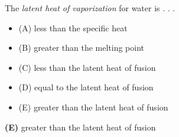 

The {\it latent heat of vaporization} for water is . . .

\begin{itemize}
\item{(A)} less than the specific heat
\vskip 5pt 
\item{(B)} greater than the melting point
\vskip 5pt 
\item{(C)} less than the latent heat of fusion
\vskip 5pt 
\item{(D)} equal to the latent heat of fusion
\vskip 5pt 
\item{(E)} greater than the latent heat of fusion
\end{itemize}







{\bf (E)} greater than the latent heat of fusion
 










